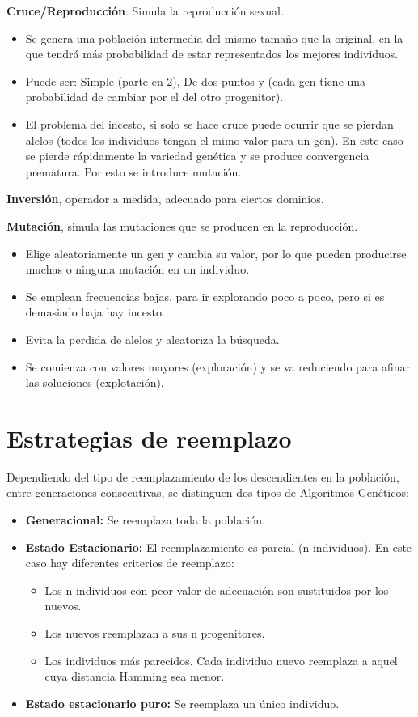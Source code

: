 \documentclass[12pt, twoside, openright]{report} %
\begin{document}
\textbf{Cruce/Reproducción}: Simula la reproducción sexual.
\begin{itemize}
	\item Se genera una población intermedia del mismo tamaño que la original, en la que tendrá más probabilidad de estar representados los mejores individuos.
	\item Puede ser: Simple (parte en 2), De dos puntos y  (cada gen tiene una probabilidad de cambiar por el del otro progenitor).
	\item El problema del incesto, si solo se hace cruce puede ocurrir que se pierdan alelos (todos los individuos tengan el mimo valor para un gen). En este caso se pierde rápidamente la variedad genética y se produce convergencia prematura. Por esto se introduce mutación.
\end{itemize}

\textbf{Inversión}, operador a medida, adecuado para ciertos dominios.

\textbf{Mutación}, simula las mutaciones que se producen en la reproducción.
\begin{itemize}
	\item  Elige aleatoriamente un gen y cambia su valor, por lo que pueden producirse muchas o ninguna mutación en un individuo.
	\item Se emplean frecuencias bajas, para ir explorando poco a poco, pero si es demasiado baja hay incesto.
	\item Evita la perdida de alelos y aleatoriza la búsqueda.
	\item Se comienza con valores mayores (exploración) y se va reduciendo para afinar las soluciones (explotación).
\end{itemize}

\section{Estrategias de reemplazo}
Dependiendo del tipo de reemplazamiento de los descendientes en la población, entre generaciones consecutivas, se distinguen dos tipos de Algoritmos Genéticos:
\begin{itemize}
	\item \textbf{Generacional:} Se reemplaza toda la población.
	\item \textbf{Estado Estacionario:} El reemplazamiento es parcial (n individuos). En este caso hay diferentes criterios de reemplazo:
	      \begin{itemize}
		      \item Los n individuos con peor valor de adecuación son sustituidos por los nuevos.
		      \item Los nuevos reemplazan a sus n progenitores.
		      \item Los individuos más parecidos. Cada individuo nuevo reemplaza a aquel cuya distancia Hamming sea menor.
	      \end{itemize}
	\item \textbf{Estado estacionario puro:} Se reemplaza un único individuo.
\end{itemize}
\end{document}
